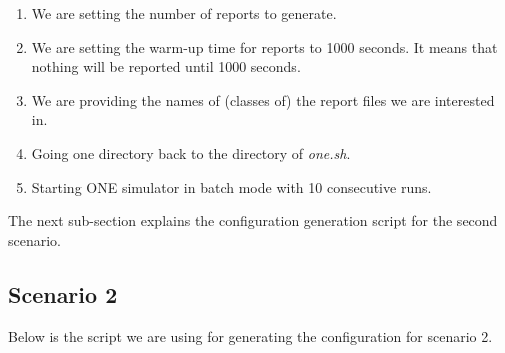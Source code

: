 \begin{enumerate}
  \item We are setting the number of reports to generate.
  \item We are setting the warm-up time for reports to 1000 seconds. It means that nothing will be reported until 1000 seconds.
  \item We are providing the names of (classes of) the report files we are interested in.
  \item Going one directory back to the directory of \textit{one.sh}.
  \item Starting ONE simulator in batch mode with 10 consecutive runs.

\end{enumerate}

The next sub-section explains the configuration generation script for the second scenario.
\subsection{Scenario 2}
Below is the script we are using for generating the configuration for scenario 2.

